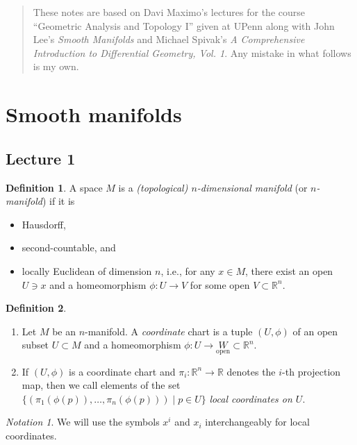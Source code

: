 \documentclass[10pt,letterpaper,cm]{nupset}
\theoremstyle{definition}
\newtheorem{definition}{Definition}[subsection]
\theoremstyle{theorem}
\theoremstyle{remark}
\newtheorem*{notation}{Notation}
\newcommand{\R}{\mathbb R}
\newcommand{\1}{\mathbf{1}}
\newcommand{\0}{\vec 0}
\begin{document}
\begin{abstract}
These notes are based on Davi Maximo's lectures for the course ``Geometric Analysis and Topology I'' given at UPenn along with John Lee's \textit{Smooth Manifolds} and Michael Spivak's \textit{A Comprehensive Introduction to Differential Geometry, Vol. 1}. Any mistake in what follows is my own.
\end{abstract}


\tableofcontents
\newpage

\section{Smooth manifolds}

\subsection{Lecture 1}

\theoremstyle{definition}
\begin{definition}{A space $M$ is a \textit{(topological) $n$-dimensional manifold} (or \textit{$n$-manifold}) if it is 
\begin{itemize}
\item Hausdorff, 
\item second-countable, and 
\item locally Euclidean of dimension $n$, i.e., for any $x\in M$, there exist an open $U\ni x$ and a homeomorphism $\phi : U \to V$ for some open $V\subset \R^n$.
\end{itemize}
}
\end{definition}

\begin{definition} $ $
\begin{enumerate}
\item Let $M$ be an $n$-manifold. A \textit{coordinate} chart is a tuple $(U, \phi)$ of an open subset $U\subset M$ and a homeomorphism $\phi: U \to \underset{\text{open}} W \subset \R^n$.
\item If $(U, \phi)$ is a coordinate chart and $\pi_i : \R^n \to \R$ denotes the $i$-th projection map, then we call elements of the set $\{(\pi_1(\phi(p)), \ldots, \pi_n(\phi(p))) \mid p \in U\}$ \textit{local coordinates on $U$}.
\end{enumerate}
\end{definition}

\begin{notation}
We will use the symbols $x^i$ and $x_i$ interchangeably for local coordinates. 
\end{notation}
\end{document}

